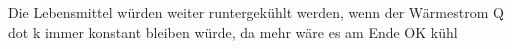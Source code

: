 Die Lebensmittel würden weiter runtergekühlt werden, wenn der Wärmestrom Q dot k immer konstant bleiben würde, da mehr wäre es am Ende OK kühl